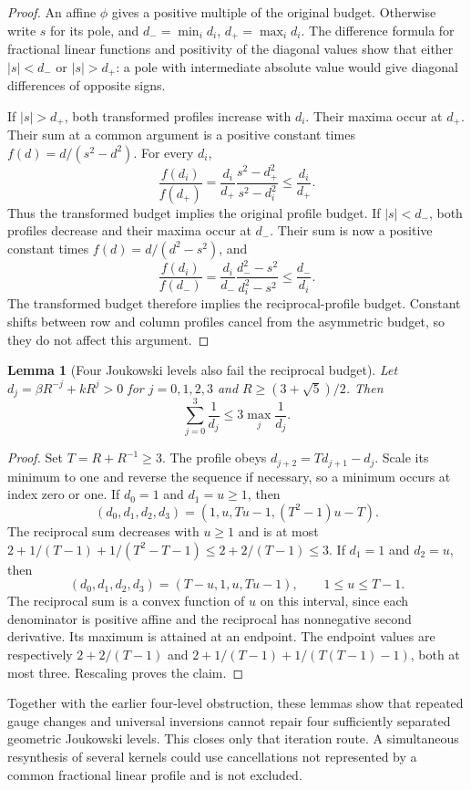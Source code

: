\documentclass[11pt]{article}
\newtheorem{lemma}{Lemma}
\begin{document}
\begin{proof}
An affine $\phi$ gives a positive multiple of the original budget.
Otherwise write $s$ for its pole, and $d_- =\min_i d_i$,
$d_+=\max_i d_i$. The difference formula for fractional linear
functions and positivity of the diagonal values show that either
$|s|<d_-$ or $|s|>d_+$: a pole with intermediate absolute value
would give diagonal differences of opposite signs.

If $|s|>d_+$, both transformed profiles increase with $d_i$.
Their maxima occur at $d_+$. Their sum at a common argument is a
positive constant times $f(d)=d/(s^2-d^2)$. For every $d_i$,
\[
 \frac{f(d_i)}{f(d_+)}
 =\frac{d_i}{d_+}\frac{s^2-d_+^2}{s^2-d_i^2}
 \le\frac{d_i}{d_+}.
\]
Thus the transformed budget implies the original profile budget.
If $|s|<d_-$, both profiles decrease and their maxima occur at $d_-$.
Their sum is now a positive constant times $f(d)=d/(d^2-s^2)$,
and
\[
 \frac{f(d_i)}{f(d_-)}
 =\frac{d_i}{d_-}\frac{d_-^2-s^2}{d_i^2-s^2}
 \le\frac{d_-}{d_i}.
\]
The transformed budget therefore implies the reciprocal-profile
budget. Constant shifts between row and column profiles cancel
from the asymmetric budget, so they do not affect this argument.
\end{proof}

\begin{lemma}[Four Joukowski levels also fail the reciprocal budget]
Let $d_j=\beta R^{-j}+kR^j>0$ for $j=0,1,2,3$ and
$R\ge(3+\sqrt5)/2$. Then
\[
 \sum_{j=0}^3\frac1{d_j}\le3\max_j\frac1{d_j}.
\]
\end{lemma}

\begin{proof}
Set $T=R+R^{-1}\ge3$. The profile obeys
$d_{j+2}=Td_{j+1}-d_j$. Scale its minimum to one and reverse the
sequence if necessary, so a minimum occurs at index zero or one.
If $d_0=1$ and $d_1=u\ge1$, then
\[
 (d_0,d_1,d_2,d_3)
 =(1,u,Tu-1,(T^2-1)u-T).
\]
The reciprocal sum decreases with $u\ge1$ and is at most
$2+1/(T-1)+1/(T^2-T-1)\le2+2/(T-1)\le3$.
If $d_1=1$ and $d_2=u$, then
\[
 (d_0,d_1,d_2,d_3)=(T-u,1,u,Tu-1),
 \qquad 1\le u\le T-1.
\]
The reciprocal sum is a convex function of $u$ on this interval,
since each denominator is positive affine and the reciprocal has
nonnegative second derivative. Its maximum is attained at an
endpoint. The endpoint values are respectively
$2+2/(T-1)$ and
$2+1/(T-1)+1/(T(T-1)-1)$, both at most three.
Rescaling proves the claim.
\end{proof}

Together with the earlier four-level obstruction, these lemmas show
that repeated gauge changes and universal inversions cannot repair
four sufficiently separated geometric Joukowski levels. This closes
only that iteration route. A simultaneous resynthesis of several
kernels could use cancellations not represented by a common
fractional linear profile and is not excluded.
\end{document}
